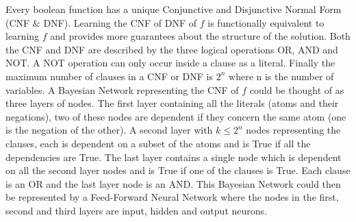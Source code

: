 Every boolean function has a unique Conjunctive and Disjunctive Normal Form (CNF \& DNF). Learning the CNF of DNF of $f$ is functionally equivalent to learning $f$ and provides more guarantees about the structure of the solution. Both the CNF and DNF are described by the three logical operations OR, AND and NOT. A NOT operation can only occur inside a clause as a literal. Finally the maximum number of clauses in a CNF or DNF is $2^n$ where n is the number of variables. A Bayesian Network representing the CNF of $f$ could be thought of as three layers of nodes. The first layer containing all the literals (atoms and their negations), two of these nodes are dependent if they concern the same atom (one is the negation of the other). A second layer with $k \leq 2^n$ nodes representing the clauses, each is dependent on a subset of the atoms and is True if all the dependencies are True. The last layer contains a single node which is dependent on all the second layer nodes and is True if one of the clauses is True. Each clause is an OR and the last layer node is an AND. This Bayesian Network could then be represented by a Feed-Forward Neural Network where the nodes in the first, second and third layers are input, hidden and output neurons.

